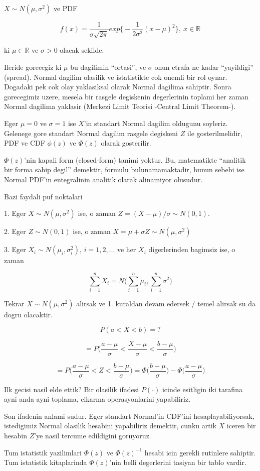 \documentclass[12pt,fleqn]{article}\usepackage{../common}
\begin{document}
$X \sim N(\mu, \sigma^2)$ ve PDF

\[ f(x) = \frac{1}{\sigma\sqrt{2\pi}} 
exp \bigg\{ - \frac{1}{2\sigma^2}(x-\mu)^2  \bigg\}
, \ x \in \mathbb{R}
\]

ki $\mu \in \mathbb{R}$ ve $\sigma > 0$ olacak sekilde.

Ileride gorecegiz ki $\mu$ bu dagilimin ``ortasi'', ve $\sigma$ onun
etrafa ne kadar ``yayildigi'' (spread). Normal dagilim olasilik ve
istatistikte cok onemli bir rol oynar. Dogadaki pek cok olay
yaklasiksal olarak Normal dagilima sahiptir. Sonra gorecegimiz uzere,
mesela bir rasgele degiskenin degerlerinin toplami her zaman Normal
dagilima yaklasir (Merkezi Limit Teorisi -Central Limit Theorem-). 

Eger $\mu = 0$ ve $\sigma = 1$ ise $X$'in standart Normal dagilim oldugunu
soyleriz. Gelenege gore standart Normal dagilim rasgele degiskeni $Z$ ile
gosterilmelidir, PDF ve CDF $\phi(z)$ ve $\Phi(z)$ olarak gosterilir. 

$\Phi(z)$'nin kapali form (closed-form) tanimi yoktur. Bu, matematikte
``analitik bir forma sahip degil'' demektir, formulu bulunamamaktadir,
bunun sebebi ise Normal PDF'in entegralinin analitik olarak alinamiyor
olusudur. 

Bazi faydali puf noktalari

1. Eger $X \sim N(\mu, \sigma^2)$ ise, o zaman $Z = (X-\mu) / \sigma \sim
N(0,1)$. 

2. Eger $Z \sim N(0,1)$ ise, o zaman $X = \mu + \sigma Z \sim N(\mu,\sigma^2)$

3. Eger $X_i \sim N(\mu_i, \sigma_i^2)$, $i=1,2,...$ ve her $X_i$
digerlerinden bagimsiz ise, o zaman 

\[ \sum_{i=1}^n X_i = N\bigg( \sum_{i=1}^n\mu_i, \sum_{i=1}^n\sigma^2 \bigg) \]

Tekrar $X \sim N(\mu, \sigma^2)$ alirsak ve 1. kuraldan devam edersek /
temel alirsak su da dogru olacaktir. 

\[ P(a < X < b) = ? \]

\[ 
= P\bigg(
\frac{a-\mu}{\sigma} < 
\frac{X-\mu}{\sigma} < 
\frac{b-\mu}{\sigma}
\bigg) 
\]

\[
= P\bigg(\frac{a-\mu}{\sigma} < Z < \frac{b-\mu}{\sigma}\bigg) 
= 
\Phi\bigg(\frac{b-\mu}{\sigma}\bigg) - 
\Phi\bigg(\frac{a-\mu}{\sigma}\bigg) 
\]

Ilk gecisi nasil elde ettik? Bir olasilik ifadesi $P(\cdot)$ icinde esitligin iki
tarafina ayni anda ayni toplama, cikarma operasyonlarini yapabiliriz. 

Son ifadenin anlami sudur. Eger standart Normal'in CDF'ini
hesaplayabiliyorsak, istedigimiz Normal olasilik hesabini yapabiliriz
demektir, cunku artik $X$ iceren bir hesabin $Z$'ye nasil tercume
edildigini goruyoruz. 

Tum istatistik yazilimlari $\Phi(z)$ ve $\Phi(z)^{-1}$ hesabi icin gerekli
rutinlere sahiptir. Tum istatistik kitaplarinda $\Phi(z)$'nin belli
degerlerini tasiyan bir tablo vardir.
\end{document}
